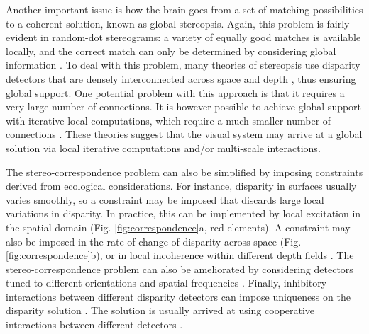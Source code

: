 Another important issue is how the brain goes from a set of matching possibilities to a coherent solution, known as global stereopsis. Again, this problem is fairly evident in random-dot stereograms: a variety of equally good matches is available locally, and the correct match can only be determined by considering global information \cite{Julesz:1971uq}. To deal with this problem, many theories of stereopsis use disparity detectors that are densely interconnected across space and depth \cite{Julesz:1971uq,Marr:1976dq,Sperling:1970ys,Prazdny:1985vn,Nelson:1975oq}, thus ensuring global support. One potential problem with this approach is that it requires a very large number of connections. It is however possible to achieve global support with iterative local computations, which require a much smaller number of connections \cite{export:75622}. These theories suggest that the visual system may arrive at a global solution via local iterative computations and/or multi-scale interactions.


The stereo-correspondence problem can also be simplified by imposing constraints derived from ecological considerations. For instance, disparity in surfaces usually varies smoothly, so a constraint may be imposed that discards large local variations in disparity. In practice, this can be implemented by local excitation in the spatial domain \cite{Sperling:1970ys,Nelson:1975oq,DEV1975511,Marr:1976dq} (Fig. \ref{fig:correspondence}a, red elements). A constraint may also be imposed in the rate of change of disparity across space \cite{Pollard01081985} (Fig. \ref{fig:correspondence}b), or in local incoherence within different depth fields \cite{Prazdny:1985vn}. The stereo-correspondence problem can also be ameliorated by considering detectors tuned to different orientations and spatial frequencies \cite{Marr:1979lh}. Finally, inhibitory interactions between different disparity detectors can impose uniqueness on the disparity solution \cite{Sperling:1970ys,Nelson:1975oq,DEV1975511,Marr:1976dq}. The solution is usually arrived at using cooperative interactions between different detectors \cite{Marr:1976dq,Marr:1979lh}.

